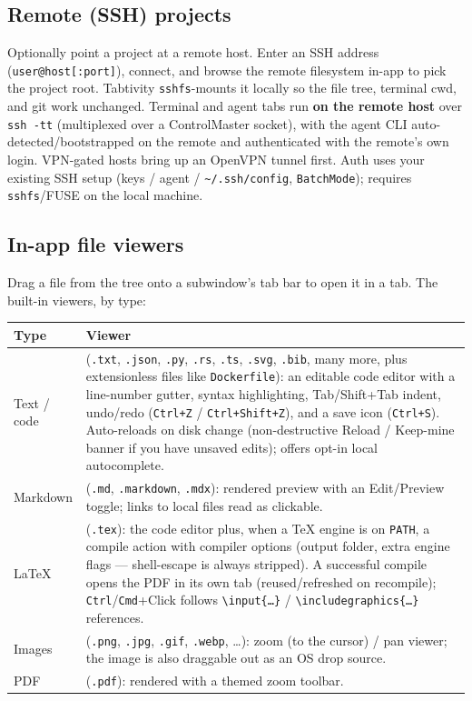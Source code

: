 \documentclass[11pt,a4paper]{article}
\newcommand{\code}[1]{\texttt{#1}}
\begin{document}
\subsection{Remote (SSH) projects}

Optionally point a project at a remote host. Enter an SSH address
(\code{user@host[:port]}), connect, and browse the remote filesystem in-app to
pick the project root. Tabtivity \code{sshfs}-mounts it locally so the file tree,
terminal cwd, and git work unchanged. Terminal and agent tabs run \textbf{on the
remote host} over \code{ssh -tt} (multiplexed over a ControlMaster socket), with
the agent CLI auto-detected/bootstrapped on the remote and authenticated with
the remote's own login. VPN-gated hosts bring up an OpenVPN tunnel first. Auth
uses your existing SSH setup (keys / agent / \code{\textasciitilde/.ssh/config},
\code{BatchMode}); requires \code{sshfs}/FUSE on the local machine.

\subsection{In-app file viewers}

Drag a file from the tree onto a subwindow's tab bar to open it in a tab. The
built-in viewers, by type:

\begin{longtable}{@{}p{2.8cm}p{11.6cm}@{}}
\toprule
\textbf{Type} & \textbf{Viewer} \\
\midrule
\endhead
Text / code &
  (\code{.txt}, \code{.json}, \code{.py}, \code{.rs}, \code{.ts}, \code{.svg},
  \code{.bib}, many more, plus extensionless files like \code{Dockerfile}): an
  editable code editor with a line-number gutter, syntax highlighting,
  Tab/Shift+Tab indent, undo/redo (\code{Ctrl+Z} / \code{Ctrl+Shift+Z}), and a
  save icon (\code{Ctrl+S}). Auto-reloads on disk change (non-destructive
  Reload / Keep-mine banner if you have unsaved edits); offers opt-in local
  autocomplete. \\
\addlinespace
Markdown &
  (\code{.md}, \code{.markdown}, \code{.mdx}): rendered preview with an
  Edit/Preview toggle; links to local files read as clickable. \\
\addlinespace
LaTeX &
  (\code{.tex}): the code editor plus, when a TeX engine is on \code{PATH}, a
  compile action with compiler options (output folder, extra engine flags ---
  shell-escape is always stripped). A successful compile opens the PDF in its
  own tab (reused/refreshed on recompile); \code{Ctrl}/\code{Cmd}+Click follows
  \code{\textbackslash input\{\dots\}} /
  \code{\textbackslash includegraphics\{\dots\}} references. \\
\addlinespace
Images &
  (\code{.png}, \code{.jpg}, \code{.gif}, \code{.webp}, \dots): zoom (to the
  cursor) / pan viewer; the image is also draggable out as an OS drop source. \\
\addlinespace
PDF &
  (\code{.pdf}): rendered with a themed zoom toolbar. \\
\bottomrule
\end{longtable}
\end{document}
